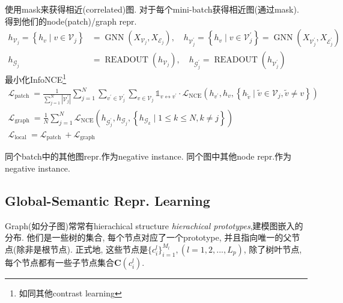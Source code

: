 \documentclass{article}
\begin{document}
使用mask来获得相近(correlated)图. 对于每个mini-batch获得相近图(通过mask). 得到他们的node(patch)/graph repr.
\begin{equation}
    \begin{aligned}
    h_{\mathcal{V}_{j}}=\left\{h_{v} \mid v \in \mathcal{V}_{j}\right\} &=\operatorname{GNN}\left(X_{\mathcal{V}_{j}}, X_{\mathcal{E}_{j}}\right), \quad h_{\mathcal{V}_{j}^{\prime}}=\left\{h_{v} \mid v \in \mathcal{V}_{j}^{\prime}\right\}=\operatorname{GNN}\left(X_{\mathcal{V}_{j}^{\prime}}, X_{\mathcal{E}_{j}^{\prime}}\right) \\
    h_{\mathcal{G}_{j}} &=\operatorname{READOUT}\left(h_{\mathcal{V}_{j}}\right), \quad h_{\mathcal{G}_{j}^{\prime}}=\operatorname{READOUT}\left(h_{\mathcal{V}_{j}^{\prime}}\right)
    \end{aligned}
\end{equation}
最小化InfoNCE\footnote{如同其他contrast learning}
\begin{equation}
    \begin{array}{c}
    \mathcal{L}_{\text {patch }}=\frac{1}{\sum_{j=1}^{N}\left|\mathcal{V}_{j}^{\prime}\right|} \sum_{j=1}^{N} \sum_{v^{\prime} \in \mathcal{V}_{j}^{\prime}} \sum_{v \in \mathcal{V}_{j}} \mathbb{1}_{v \leftrightarrow v^{\prime}} \cdot \mathcal{L}_{\mathrm{NCE}}\left(h_{v^{\prime}}, h_{v},\left\{h_{\tilde{v}} \mid \tilde{v} \in \mathcal{V}_{j}, \tilde{v} \neq v\right\}\right) \\
    \mathcal{L}_{\text {graph }}=\frac{1}{N} \sum_{j=1}^{N} \mathcal{L}_{\mathrm{NCE}}\left(h_{\mathcal{G}_{j}^{\prime}}, h_{\mathcal{G}_{j}},\left\{h_{\mathcal{G}_{k}} \mid 1 \leqslant k \leqslant N, k \neq j\right\}\right) \\
    \mathcal{L}_{\text {local }}=\mathcal{L}_{\text {patch }}+\mathcal{L}_{\text {graph }}
    \end{array}
\end{equation}

 同个batch中的其他图repr.作为negative instance. 同个图中其他node repr.作为negative instance.

\subsection{Global-Semantic Repr. Learning}

Graph(如分子图)常常有hierachical structure \trarr \textit{hierachical prototypes},建模图嵌入的分布. 他们是一些树的集合, 每个节点对应了一个prototype, 并且指向唯一的父节点(除非是根节点). 正式地, 这些节点是$\{c_i^l\}_{i=1}^{M_l},(l=1,2,...,L_p)$, 除了树叶节点, 每个节点都有一些子节点集合$\bm{C}(c_i^l)$.
\end{document}

